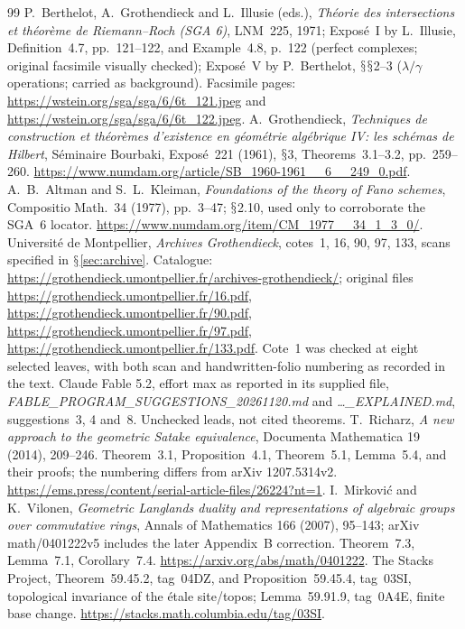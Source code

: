 \documentclass[11pt,a4paper]{article}
\renewcommand{\S}{\ensuremath{\mathsection}}
\theoremstyle{named}\newtheorem{finding}{Finding}[section]
\theoremstyle{definition}\newtheorem{definition}[finding]{Definition}
\theoremstyle{remark}\newtheorem{remark}[finding]{Remark}
\begin{document}
\begin{thebibliography}{99}
 P.~Berthelot, A.~Grothendieck and L.~Illusie (eds.), \emph{Th\'eorie des intersections et th\'eor\`eme de Riemann--Roch (SGA 6)}, LNM~225, 1971; Expos\'e~I by L.~Illusie, Definition~4.7, pp.~121--122, and Example~4.8, p.~122 (perfect complexes; original facsimile visually checked); Expos\'e~V by P.~Berthelot, \S\S2--3 ($\lambda/\gamma$ operations; carried as background). Facsimile pages: \url{https://wstein.org/sga/sga/6/6t_121.jpeg} and \url{https://wstein.org/sga/sga/6/6t_122.jpeg}.
 A.~Grothendieck, \emph{Techniques de construction et th\'eor\`emes d'existence en g\'eom\'etrie alg\'ebrique IV: les sch\'emas de Hilbert}, S\'eminaire Bourbaki, Expos\'e~221 (1961), \S3, Theorems~3.1--3.2, pp.~259--260. \url{https://www.numdam.org/article/SB_1960-1961__6__249_0.pdf}.
 A.~B.~Altman and S.~L.~Kleiman, \emph{Foundations of the theory of Fano schemes}, Compositio Math.~34 (1977), pp.~3--47; \S2.10, used only to corroborate the SGA~6 locator. \url{https://www.numdam.org/item/CM_1977__34_1_3_0/}.
 Universit\'e de Montpellier, \emph{Archives Grothendieck}, cotes~1, 16, 90, 97, 133, scans specified in \S\ref{sec:archive}. Catalogue: \url{https://grothendieck.umontpellier.fr/archives-grothendieck/}; original files \url{https://grothendieck.umontpellier.fr/16.pdf}, \url{https://grothendieck.umontpellier.fr/90.pdf}, \url{https://grothendieck.umontpellier.fr/97.pdf}, \url{https://grothendieck.umontpellier.fr/133.pdf}. Cote~1 was checked at eight selected leaves, with both scan and handwritten-folio numbering as recorded in the text.
 Claude Fable 5.2, effort max as reported in its supplied file, \emph{FABLE\_PROGRAM\_SUGGESTIONS\_20261120.md} and \emph{\ldots\_EXPLAINED.md}, suggestions~3, 4 and~8. Unchecked leads, not cited theorems.
 T.~Richarz, \emph{A new approach to the geometric Satake equivalence}, Documenta Mathematica 19 (2014), 209--246. Theorem~3.1, Proposition~4.1, Theorem~5.1, Lemma~5.4, and their proofs; the numbering differs from arXiv 1207.5314v2. \url{https://ems.press/content/serial-article-files/26224?nt=1}.
 I.~Mirkovi\'c and K.~Vilonen, \emph{Geometric Langlands duality and representations of algebraic groups over commutative rings}, Annals of Mathematics 166 (2007), 95--143; arXiv math/0401222v5 includes the later Appendix~B correction. Theorem~7.3, Lemma~7.1, Corollary~7.4. \url{https://arxiv.org/abs/math/0401222}.
 The Stacks Project, Theorem~59.45.2, tag~04DZ, and Proposition~59.45.4, tag~03SI, topological invariance of the \'etale site/topos; Lemma~59.91.9, tag~0A4E, finite base change. \url{https://stacks.math.columbia.edu/tag/03SI}.

\end{thebibliography}
\end{document}
